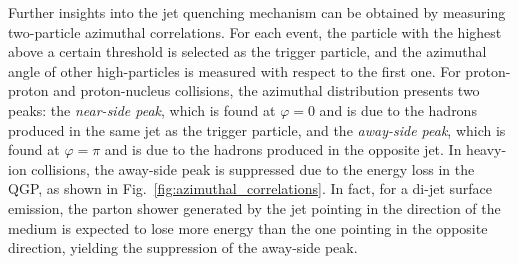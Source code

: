 Further insights into the jet quenching mechanism can be obtained by measuring two-particle azimuthal correlations. For each event, the particle with the highest \pt above a certain threshold is selected as the trigger particle, and the azimuthal angle of other high-\pt particles is measured with respect to the first one. For proton-proton and proton-nucleus collisions, the azimuthal distribution presents two peaks: the \emph{near-side peak}, which is found at $\varphi=0$ and is due to the hadrons produced in the same jet as the trigger particle, and the \emph{away-side peak}, which is found at $\varphi=\pi$ and is due to the hadrons produced in the opposite jet. In heavy-ion collisions, the away-side peak is suppressed due to the energy loss in the QGP, as shown in Fig.~\ref{fig:azimuthal_correlations}. In fact, for a di-jet surface emission, the parton shower generated by the jet pointing in the direction of the medium is expected to lose more energy than the one pointing in the opposite direction, yielding the suppression of the away-side peak.


